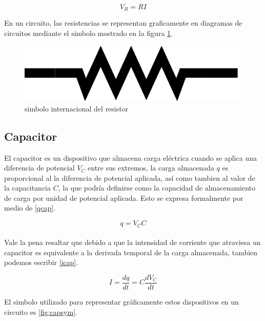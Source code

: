 \documentclass[letterpaper,12pt]{article} %
\begin{document}
\begin{equation} 
V_R=RI
\label{lohm}
\end{equation}

En un circuito, las resistencias se representan graficamente en diagramas de  circuitos mediante el simbolo mostrado en la figura \ref{fig:ressym}.\\
\begin{figure}[h]
\includegraphics[scale=0.115]{res.png}
\centering
\caption{simbolo internacional del resistor}
\label{fig:ressym}
\end{figure}

\subsection*{Capacitor}

El capacitor es un dispositivo que almacena carga eléctrica cuando se aplica una diferencia de potencial $V_C$ entre sus extremos, la carga almacenada $q$ es proporcional al la diferencia de potencial aplicada, así como tambien al valor de la capacitancia $C$, la que podría definirse como la capacidad de almacenamiento de carga por unidad de potencial aplicada. Esto se expresa formalmente por medio de \eqref{qcap}.

\begin{equation}
q=V_CC
\label{qcap}
\end{equation}\\

Vale la pena resaltar que debido a que la intensidad de corriente que atraviesa un capacitor es equivalente a la derivada temporal de la carga almacenada, tambien podemos escribir \eqref{icap}.

\begin{equation}
I=\frac{dq}{dt}=C\frac{dV_C}{dt}
\label{icap}
\end{equation}

El simbolo utilizado para representar gráficamente estos dispositivos en un circuito es \ref{fig:capsym}.
\end{document}
